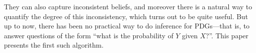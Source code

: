 \documentclass{article}
\newcommand\discard[1]{}
\begin{document}
They can also capture inconsistent beliefs,
and moreover 
there is 
a 
natural
way to quantify the degree of this inconsistency,
which turns out to be quite useful.
But up to now,
there has been no practical way to do 
inference 
for
PDGs---that is,
to answer questions of the form ``what is the probability of $Y$ given $X$?''.
This paper presents the first such {\color{red}algorithm}.
\end{document}
